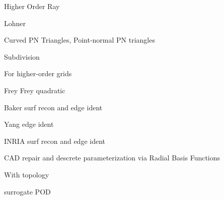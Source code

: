 \documentclass{article}
\begin{document}
Higher Order Ray\cite{ray-delany-einstein-jiao-robust-ho-surf-recon-remesh}

Lohner\cite{lohner-regridding-surface}
\cite{kim-takano-nakahashi-adjoint-adapt,kim-nakahashi-adjoint-adapt-viscous}

Curved PN Triangles,
Point-normal PN triangles\cite{vlachos-curved-pn-triangles}

Subdivision\cite{haimes-imr15-subdivision}

For higher-order grids\cite{unstruct-3d-ho-grid-dg-surf-recon}
\cite{jiao-wang-resonstruct-ho-surf}

Frey\cite{frey-imr9-about-surface-remeshing}
Frey quadratic\cite{dapogny-dobrzynski-frey-3d-adapt-surf-recon}

Baker surf recon and edge ident\cite{baker-imr13}

Yang edge ident\cite{yang-zheng-wang-joint-line-detection-tri}

INRIA surf recon and edge ident\cite{borouchaki-surface-reconstruction}

CAD repair and descrete parameterization via Radial Basis Functions
\cite{cad-repair-discrete-param-rbf}

With topology\cite{lepage-habashi-cad-reconstruction}

surrogate POD\cite{bobrowski-surrogate-geom-pod-adj-opt}



\end{document}
